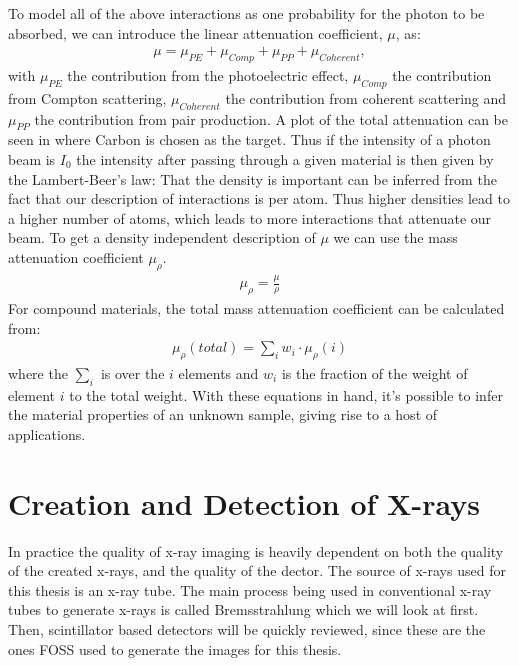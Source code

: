 To model all of the above interactions as one probability for the photon to be absorbed, we can introduce the linear attenuation coefficient, $\mu$, as:
\begin{align}
\label{eq:lin_coeff}
\mu = \mu_{PE} + \mu_{Comp} + \mu_{PP} + \mu_{Coherent},
\end{align}
with $\mu_{PE}$ the contribution from the photoelectric effect, $\mu_{Comp}$ the contribution from Compton scattering, $\mu_{Coherent}$ the contribution from coherent scattering and $\mu_{PP}$ the contribution from pair production.
A plot of the total attenuation can be seen in  where Carbon is chosen as the target.
Thus if the intensity of a photon beam is $I_0$ the intensity after passing through a given material is then given by the Lambert-Beer's law:
That the density is important can be inferred from the fact that our description of interactions is per atom. Thus higher densities lead to a higher number of atoms, which leads to more interactions that attenuate our beam. 
To get a density independent description of $\mu$ we can use the mass attenuation coefficient $\mu_\rho$.
\begin{align}
\mu_{\rho} = \frac{\mu}{\rho}
\end{align}
For compound materials, the total mass attenuation coefficient can be calculated from:
\begin{align}
\label{eq:compound}
\mu_{\rho}(total) = \sum_i w_i \cdot \mu_{\rho}(i)
\end{align}
where the $\sum_i$  is over the $i$ elements and $w_i$ is the fraction of the weight of element $i$ to the total weight. With these equations in hand, it's possible to infer the material properties of an unknown sample, giving rise to a host of applications.
\section{Creation and Detection of X-rays}
\label{sec:cdx-rays}
In practice the quality of x-ray imaging is heavily dependent on both the quality of the created x-rays, and the quality of the dector. 
The source of x-rays used for this thesis is an x-ray tube.
The main process being used in conventional x-ray tubes to generate x-rays is called Bremsstrahlung which we will look at first. 
Then, scintillator based detectors will be quickly reviewed, since these are the ones FOSS used to generate the images for this thesis. 

